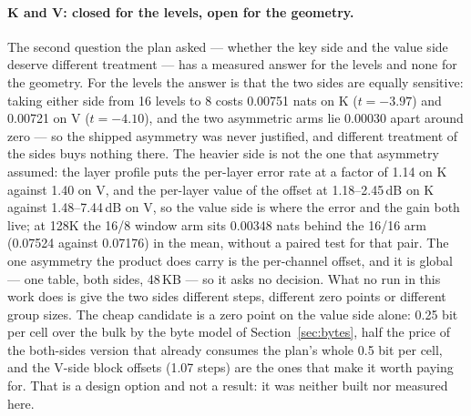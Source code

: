 \documentclass[10pt,twocolumn]{article}
\begin{document}
\paragraph{K and V: closed for the levels, open for the geometry.} The second question the plan asked --- whether the key side and the value side deserve different treatment --- has a measured answer for the levels and none for the geometry. For the levels the answer is that the two sides are equally sensitive: taking either side from 16 levels to 8 costs 0.00751 nats on K ($t = -3.97$) and 0.00721 on V ($t = -4.10$), and the two asymmetric arms lie 0.00030 apart around zero --- so the shipped asymmetry was never justified, and different treatment of the sides buys nothing there. The heavier side is not the one that asymmetry assumed: the layer profile puts the per-layer error rate at a factor of 1.14 on K against 1.40 on V, and the per-layer value of the offset at 1.18--2.45\,dB on K against 1.48--7.44\,dB on V, so the value side is where the error and the gain both live; at 128K the 16/8 window arm sits 0.00348 nats behind the 16/16 arm (0.07524 against 0.07176) in the mean, without a paired test for that pair. The one asymmetry the product does carry is the per-channel offset, and it is global --- one table, both sides, 48\,KB --- so it asks no decision. What no run in this work does is give the two sides different steps, different zero points or different group sizes. The cheap candidate is a zero point on the value side alone: 0.25 bit per cell over the bulk by the byte model of Section~\ref{sec:bytes}, half the price of the both-sides version that already consumes the plan's whole 0.5 bit per cell, and the V-side block offsets (1.07 steps) are the ones that make it worth paying for. That is a design option and not a result: it was neither built nor measured here.
\end{document}
